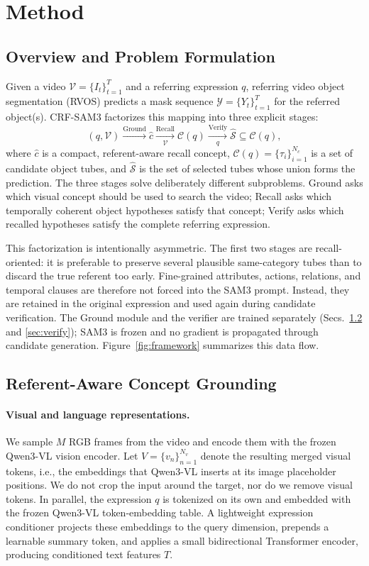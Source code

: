 \section{Method}

\subsection{Overview and Problem Formulation}
Given a video $\mathcal{V}=\{I_t\}_{t=1}^{T}$ and a referring expression $q$, referring video object segmentation (RVOS) predicts a mask sequence $\mathcal{Y}=\{Y_t\}_{t=1}^{T}$ for the referred object(s). CRF-SAM3 factorizes this mapping into three explicit stages:
\begin{equation}
(q,\mathcal{V})
\xrightarrow{\text{Ground}}
\hat c
\xrightarrow[\mathcal{V}]{\text{Recall}}
\mathcal{C}(q)
\xrightarrow[\,q\,]{\text{Verify}}
\hat{\mathcal{S}}\subseteq\mathcal{C}(q),
\end{equation}
where $\hat c$ is a compact, referent-aware recall concept, $\mathcal{C}(q)=\{\tau_i\}_{i=1}^{N_c}$ is a set of candidate object tubes, and $\hat{\mathcal{S}}$ is the set of selected tubes whose union forms the prediction. The three stages solve deliberately different subproblems. Ground asks which visual concept should be used to search the video; Recall asks which temporally coherent object hypotheses satisfy that concept; Verify asks which recalled hypotheses satisfy the complete referring expression.

This factorization is intentionally asymmetric. The first two stages are recall-oriented: it is preferable to preserve several plausible same-category tubes than to discard the true referent too early. Fine-grained attributes, actions, relations, and temporal clauses are therefore not forced into the SAM3 prompt. Instead, they are retained in the original expression and used again during candidate verification. The Ground module and the verifier are trained separately (Secs.~\ref{sec:ground} and \ref{sec:verify}); SAM3 is frozen and no gradient is propagated through candidate generation. Figure~\ref{fig:framework} summarizes this data flow.

\subsection{Referent-Aware Concept Grounding}
\label{sec:ground}
\paragraph{Visual and language representations.}
We sample $M$ RGB frames from the video and encode them with the frozen Qwen3-VL vision encoder. Let $V=\{v_n\}_{n=1}^{N_v}$ denote the resulting merged visual tokens, i.e., the embeddings that Qwen3-VL inserts at its image placeholder positions. We do not crop the input around the target, nor do we remove visual tokens. In parallel, the expression $q$ is tokenized on its own and embedded with the frozen Qwen3-VL token-embedding table. A lightweight expression conditioner projects these embeddings to the query dimension, prepends a learnable summary token, and applies a small bidirectional Transformer encoder, producing conditioned text features $T$.

